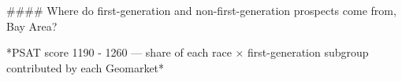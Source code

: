 #### Where do first-generation and non-first-generation prospects come from, Bay Area?

*PSAT score 1190 - 1260 — share of each race × first-generation subgroup contributed by each Geomarket*
